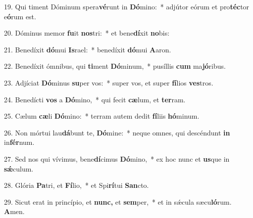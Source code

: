 \item 19. Qui timent Dóminum spera\textbf{vé}runt in \textbf{Dó}mino:~* adjútor eórum et pro\textbf{téc}tor e\textbf{ó}rum est.
\item 20. Dóminus memor \textbf{fu}it \textbf{nos}tri:~* et bene\textbf{dí}xit \textbf{no}bis:
\item 21. Benedíxit \textbf{dó}mui \textbf{Is}rael:~* benedíxit \textbf{dó}mui \textbf{A}aron.
\item 22. Benedíxit ómnibus, qui \textbf{ti}ment \textbf{Dó}minum,~* pusíllis \textbf{cum} ma\textbf{jó}ribus.
\item 23. Adjíciat \textbf{Dó}minus \textbf{su}per vos:~* super vos, et super \textbf{fí}lios \textbf{ves}tros.
\item 24. Benedícti \textbf{vos} a \textbf{Dó}mino,~* qui fecit \textbf{cæ}lum, et \textbf{ter}ram.
\item 25. Cælum \textbf{cæ}li \textbf{Dó}mino:~* terram autem dedit \textbf{fí}liis \textbf{hó}minum.
\item 26. Non mórtui lau\textbf{dá}bunt te, \textbf{Dó}mine:~* neque omnes, qui descéndunt \textbf{in} in\textbf{fér}num.
\item 27. Sed nos qui vívimus, bene\textbf{dí}cimus \textbf{Dó}mino,~* ex hoc nunc et \textbf{us}que in \textbf{sǽ}culum.
\item 28. Glória \textbf{Pa}tri, et \textbf{Fí}lio,~* et Spi\textbf{rí}tui \textbf{San}cto.
\item 29. Sicut erat in princípio, et \textbf{nunc,} et \textbf{sem}per,~* et in sǽcula sæcu\textbf{ló}rum. \textbf{A}men.
